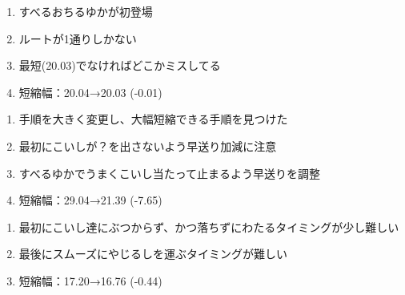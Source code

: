 \begin{enumerate}[label={\sarrow}]
\item すべるおちるゆかが初登場
\item ルートが1通りしかない
\item 最短(20.03)でなければどこかミスしてる
\item 短縮幅：20.04→20.03 (-0.01)
\end{enumerate}



\begin{enumerate}[label={\sarrow}]
\item 手順を大きく変更し、大幅短縮できる手順を見つけた
\item 最初にこいしが？\hspace{0pt}を出さないよう早送り加減に注意
\item すべるゆかでうまくこいし当たって止まるよう早送りを調整
\item 短縮幅：29.04→21.39 (-7.65)
\end{enumerate}








\begin{enumerate}[label={\sarrow}]
\item 最初にこいし達にぶつからず、かつ落ちずにわたるタイミングが少し難しい
\item 最後にスムーズにやじるしを運ぶタイミングが難しい
\item 短縮幅：17.20→16.76 (-0.44)
\end{enumerate}



